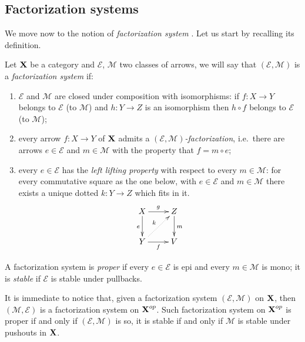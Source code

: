 \documentclass[a4paper,UKenglish,cleveref,pdftex,thm-restate,numberwithinsect]{lipics-v2021}
\def\X{\textbf {\textup{X}}}
\begin{document}
\subsection{Factorization systems}

We move now to the notion of \emph{factorization system} \cite{adamek2009abstract,bousfield1977constructions,kelly1991note,rosicky2007factorization,tholen1983factorizations}. Let us start by recalling its definition.

\begin{definition}\label{def:fs}
	Let $\X$ be a category and $\mathcal{E}$, $\mathcal{M}$ two classes of arrows, we will say that $(\mathcal{E},\mathcal{M})$ is a \emph{factorization system} if:
	\begin{enumerate}
		\item $\mathcal{E}$ and $\mathcal{M}$ are closed under composition with isomorphisms: if $f\colon X\to Y$ belongs to $\mathcal{E}$ (to $\mathcal{M}$) and $h\colon Y\to Z$ is an isomorphism then $h\circ f$ belongs to $\mathcal{E}$ (to $\mathcal{M}$);
		\item  every arrow $f\colon X\to Y$ of $\X$ admits a \emph{$(\mathcal{E}, \mathcal{M})$-factorization}, i.e.~there are arrows $e\in \mathcal{E}$ and $m\in \mathcal{M}$ with the property that $f=m\circ e$;
		\item every $e\in \mathcal{E}$ has the \emph{left lifting property} with respect to every $m\in \mathcal{M}$: for every commutative square as the one below, with $e\in \mathcal{E}$ and $m\in \mathcal{M}$ there exists a unique dotted $k\colon Y\rightarrow Z$ which fits in it.
		\[\xymatrix{X \ar[r]^g \ar[d]_{e}& Z \ar[d]^{m}\\ Y \ar[r]_{f} \ar@{.>}[ur]^{k}& V}\] 
	\end{enumerate}
	
	A factorization system is \emph{proper} if every $e\in \mathcal{E}$ is epi and every $m\in \mathcal{M}$ is mono; it is \emph{stable} if $\mathcal{E}$ is stable under pullbacks.
\end{definition}

\begin{remark}\label{rem:dual}It is immediate to notice that, given a factorization system $(\mathcal{E}, \mathcal{M})$ on $\X$, then $(\mathcal{M}, \mathcal{E})$ is a factorization system on $\X^{op}$. Such factorization system on $\X^{op}$ is proper if and only if $(\mathcal{E}, \mathcal{M})$ is so, it is stable if and only if $\mathcal{M}$ is stable under pushouts in $\X$.  
\end{remark}
\end{document}
